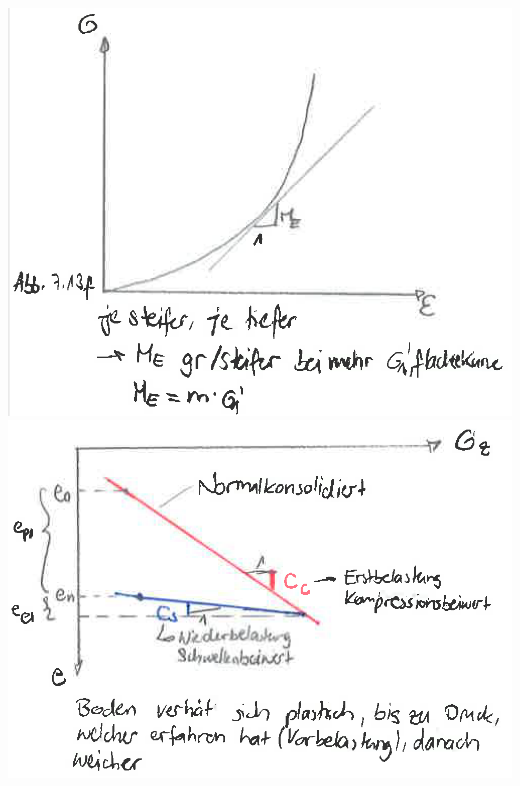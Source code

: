 %



\begin{minipage}{\linewidth}
	\includegraphics[width=0.4\linewidth]{images/Kons1SpDehnungsDiagramm} \qquad
	\includegraphics[width=0.4\linewidth]{images/Kons2SPPorenDiagrammCcCs.PNG}
\end{minipage}

